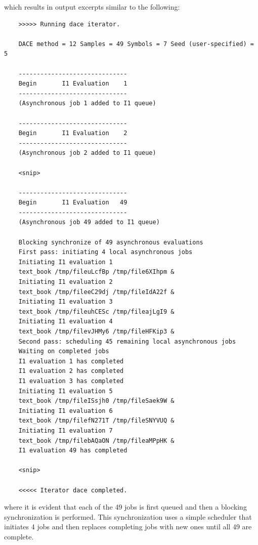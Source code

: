 which results in output excerpts similar to the following:
\begin{small}
\begin{verbatim}
    >>>>> Running dace iterator.
    
    DACE method = 12 Samples = 49 Symbols = 7 Seed (user-specified) = 5
    
    ------------------------------
    Begin       I1 Evaluation    1
    ------------------------------
    (Asynchronous job 1 added to I1 queue)
    
    ------------------------------
    Begin       I1 Evaluation    2
    ------------------------------
    (Asynchronous job 2 added to I1 queue)
    
    <snip>
    
    ------------------------------
    Begin       I1 Evaluation   49
    ------------------------------
    (Asynchronous job 49 added to I1 queue)
    
    Blocking synchronize of 49 asynchronous evaluations
    First pass: initiating 4 local asynchronous jobs
    Initiating I1 evaluation 1
    text_book /tmp/fileuLcfBp /tmp/file6XIhpm &
    Initiating I1 evaluation 2
    text_book /tmp/fileeC29dj /tmp/fileIdA22f &
    Initiating I1 evaluation 3
    text_book /tmp/fileuhCESc /tmp/fileajLgI9 &
    Initiating I1 evaluation 4
    text_book /tmp/filevJHMy6 /tmp/fileHFKip3 &
    Second pass: scheduling 45 remaining local asynchronous jobs
    Waiting on completed jobs
    I1 evaluation 1 has completed
    I1 evaluation 2 has completed
    I1 evaluation 3 has completed
    Initiating I1 evaluation 5
    text_book /tmp/fileISsjh0 /tmp/fileSaek9W &
    Initiating I1 evaluation 6
    text_book /tmp/filefN271T /tmp/fileSNYVUQ &
    Initiating I1 evaluation 7
    text_book /tmp/filebAQaON /tmp/fileaMPpHK &
    I1 evaluation 49 has completed
    
    <snip>
    
    <<<<< Iterator dace completed.
\end{verbatim}
\end{small}
where it is evident that each of the 49 jobs is first queued and then
a blocking synchronization is performed.  This synchronization uses a
simple scheduler that initiates 4 jobs and then replaces completing
jobs with new ones until all 49 are complete.

